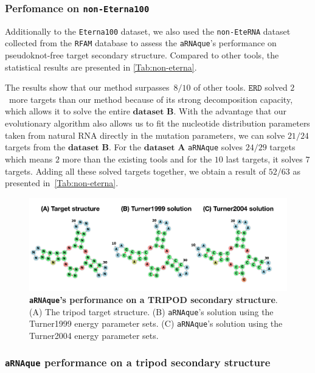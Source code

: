 \subsubsection{Perfomance on \texttt{non-Eterna100}}
Additionally to the \texttt{Eterna100} dataset, we also used the \texttt{non-EteRNA} dataset collected from the \texttt{RFAM} database to assess the \texttt{aRNAque}'s performance on pseudoknot-free target secondary structure. Compared to other tools, the statistical results are presented in {\autoref{Tab:non-eterna}}. 

The results show that our method surpasses~\(8/10\) of other tools. \(\texttt{ERD}\) solved \(2\)~more targets than our method because of its strong decomposition capacity, which allows it to solve the entire \(\textbf{dataset B}\). With the advantage that our evolutionary algorithm also allows us to fit the nucleotide distribution parameters taken from natural \ac{RNA} directly in the mutation parameters, we can solve \(21/24\) targets from the \(\textbf{dataset B}\). For the \(\textbf{dataset A}\) \texttt{aRNAque} solves \(24/29\) targets which means \(2\) more than the existing tools and for the \(10\) last targets, it solves \(7\) targets. Adding all these solved targets together, we obtain a result of \(52/63\) as presented in~{\autoref{Tab:non-eterna}}.

\begin{figure}[t!]
	\includegraphics[width=1.0\linewidth]{../res/images/arnaque/fig9.png}
	\caption{\textbf{\texttt{aRNAque}'s performance on a TRIPOD secondary structure}. (A) The tripod target structure. (B) \texttt{aRNAque}'s solution using the Turner1999 energy parameter sets. (C) \texttt{aRNAque}'s solution using the Turner2004 energy parameter sets.}
	\label{Fig:tripod}
\end{figure}
\subsubsection{\texttt{aRNAque} performance on a tripod secondary structure}

